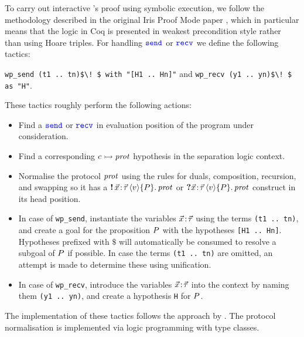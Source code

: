 To carry out interactive \lname's proof using symbolic execution, we follow the
methodology described in the original Iris Proof Mode paper \cite{krebbers-POPL2017},
which in particular means that the logic in Coq is presented in weakest precondition
style rather than using Hoare triples.
For handling $\texttt{\color{blue} send}$ or $\texttt{\color{blue} recv}$ we define the following tactics:
\begin{center}
\lstinline|wp_send (t1 .. tn)$\! $ with "[H1 .. Hn]"| \quad and \quad
\lstinline|wp_recv (y1 .. yn)$\! $ as "H"|.
\end{center}
These tactics roughly perform the following actions:
\begin{itemize}
\item Find a $\texttt{\color{blue} send}$ or $\texttt{\color{blue} recv}$ in evaluation position of the program
  under consideration.
\item Find a corresponding $c \rightarrowtail \mathit{prot}$ hypothesis in the separation
  logic context.
\item Normalise the protocol $\mathit{prot}$ using the rules for duals, composition,
  recursion, and swapping so it has a
  $\sendprot {\xdots} \val \iprop \prot$ or
  $\recvprot {\xdots} \val \iprop \prot$ construct in its head position.
\item In case of \lstinline|wp_send|, instantiate the variables $\vec{x}\!:\!\vec{\tau}$ using
  the terms \lstinline|(t1 .. tn)|, and create a goal for the proposition
  $P$ with the hypotheses \lstinline|[H1 .. Hn]|.
  Hypotheses prefixed with $\mathtt{\$}$ will automatically be consumed to resolve a
  subgoal of $P$ if possible.
  In case the terms \lstinline|(t1 .. tn)| are omitted, an attempt is made to
  determine these using unification.
\item In case of \lstinline|wp_recv|, introduce the variables $\vec{x}\!:\!\vec{\tau}$ into the
  context by naming them \lstinline|(y1 .. yn)|, and create a hypothesis
  \lstinline|H| for $P$.
\end{itemize}
The implementation of these tactics follows the approach by \cite{krebbers-POPL2017}.
The protocol normalisation is implemented via logic programming with type
classes.

